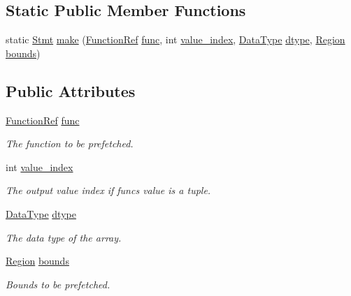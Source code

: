 \subsection*{Static Public Member Functions}
\begin{DoxyCompactItemize}
\item 
static \hyperlink{classtvm_1_1tir_1_1Stmt}{Stmt} \hyperlink{classtvm_1_1tir_1_1PrefetchNode_a106bdc39611c6e46c78b7d6920c5c51d}{make} (\hyperlink{classtvm_1_1tir_1_1FunctionRef}{Function\+Ref} \hyperlink{classtvm_1_1tir_1_1PrefetchNode_a59428251589e635271007c8b92a051e0}{func}, int \hyperlink{classtvm_1_1tir_1_1PrefetchNode_a0c2bdc2deb363f41b0362c6a9ed4296f}{value\+\_\+index}, \hyperlink{namespacetvm_a41918af1a1dc386388639a9d3ad06c5d}{Data\+Type} \hyperlink{classtvm_1_1tir_1_1PrefetchNode_aaeccff8519185fc44caa07005ef56af3}{dtype}, \hyperlink{namespacetvm_1_1tir_a8277e2a3d81a80a4776705673df51e0a}{Region} \hyperlink{classtvm_1_1tir_1_1PrefetchNode_a9ce8a82f03dd23e200ec6c611fddeb9c}{bounds})
\end{DoxyCompactItemize}
\subsection*{Public Attributes}
\begin{DoxyCompactItemize}
\item 
\hyperlink{classtvm_1_1tir_1_1FunctionRef}{Function\+Ref} \hyperlink{classtvm_1_1tir_1_1PrefetchNode_a59428251589e635271007c8b92a051e0}{func}
\begin{DoxyCompactList}\small\item\em The function to be prefetched. \end{DoxyCompactList}\item 
int \hyperlink{classtvm_1_1tir_1_1PrefetchNode_a0c2bdc2deb363f41b0362c6a9ed4296f}{value\+\_\+index}
\begin{DoxyCompactList}\small\item\em The output value index if func\textquotesingle{}s value is a tuple. \end{DoxyCompactList}\item 
\hyperlink{namespacetvm_a41918af1a1dc386388639a9d3ad06c5d}{Data\+Type} \hyperlink{classtvm_1_1tir_1_1PrefetchNode_aaeccff8519185fc44caa07005ef56af3}{dtype}
\begin{DoxyCompactList}\small\item\em The data type of the array. \end{DoxyCompactList}\item 
\hyperlink{namespacetvm_1_1tir_a8277e2a3d81a80a4776705673df51e0a}{Region} \hyperlink{classtvm_1_1tir_1_1PrefetchNode_a9ce8a82f03dd23e200ec6c611fddeb9c}{bounds}
\begin{DoxyCompactList}\small\item\em Bounds to be prefetched. \end{DoxyCompactList}\end{DoxyCompactItemize}
